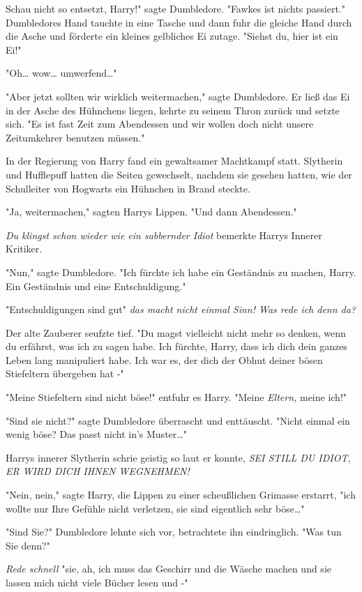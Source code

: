 {Schau nicht so entsetzt, Harry!" sagte Dumbledore. "Fawkes ist nichts passiert." Dumbledores Hand tauchte in eine Tasche und dann fuhr die gleiche Hand durch die Asche und förderte ein kleines gelbliches Ei zutage. "Siehst du, hier ist ein Ei!"

"Oh… wow… umwerfend…"

"Aber jetzt sollten wir wirklich weitermachen," sagte Dumbledore. Er ließ das Ei in der Asche des Hühnchens liegen, kehrte zu seinem Thron zurück und setzte sich. "Es ist fast Zeit zum Abendessen und wir wollen doch nicht unsere Zeitumkehrer benutzen müssen."

In der Regierung von Harry fand ein gewaltsamer Machtkampf statt. Slytherin und Hufflepuff hatten die Seiten gewechselt, nachdem sie gesehen hatten, wie der Schulleiter von Hogwarts ein Hühnchen in Brand steckte.

"Ja, weitermachen," sagten Harrys Lippen. "Und dann Abendessen."

\emph{Du klingst schon wieder wie ein sabbernder Idiot} bemerkte Harrys Innerer Kritiker.

"Nun," sagte Dumbledore. "Ich fürchte ich habe ein Geständnis zu machen, Harry. Ein Geständnis und eine Entschuldigung."

"Entschuldigungen sind gut" \emph{das macht nicht einmal Sinn! Was rede ich denn da?}

Der alte Zauberer seufzte tief. "Du magst vielleicht nicht mehr so denken, wenn du erfährst, was ich zu sagen habe. Ich fürchte, Harry, dass ich dich dein ganzes Leben lang manipuliert habe. Ich war es, der dich der Obhut deiner bösen Stiefeltern übergeben hat -"

"Meine Stiefeltern sind nicht böse!" entfuhr es Harry. "Meine \emph{Eltern,} meine ich!"

"Sind sie nicht?" sagte Dumbledore überrascht und enttäuscht. "Nicht einmal ein wenig böse? Das passt nicht in's Muster…"

Harrys innerer Slytherin schrie geistig so laut er konnte, \emph{SEI STILL DU IDIOT, ER WIRD DICH IHNEN WEGNEHMEN!}

"Nein, nein," sagte Harry, die Lippen zu einer scheußlichen Grimasse erstarrt, "ich wollte nur Ihre Gefühle nicht verletzen, sie sind eigentlich sehr böse…"

"Sind Sie?" Dumbledore lehnte sich vor, betrachtete ihn eindringlich. "Was tun Sie denn?"

\emph{Rede schnell} "sie, ah, ich muss das Geschirr und die Wäsche machen und sie lassen mich nicht viele Bücher lesen und -"

}
